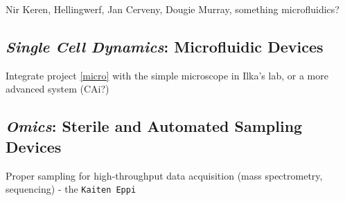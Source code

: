 \documentclass[12pt,a4paper]{scrartcl}
\begin{document}
Nir Keren, Hellingwerf, Jan Cerveny, Dougie Murray,
something microfluidics?

\subsection{\textit{Single Cell Dynamics}: Microfluidic Devices}
Integrate project \ref{micro} with the simple microscope in
Ilka's lab, or a more advanced system (CAi?)


\subsection{\textit{Omics}: Sterile and Automated Sampling Devices}

Proper sampling for high-throughput data acquisition (mass
spectrometry, sequencing) - the \texttt{Kaiten Eppi}
\end{document}
